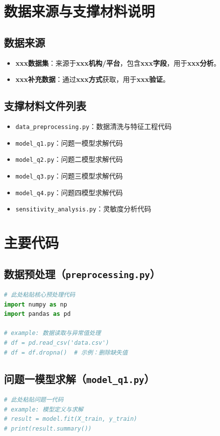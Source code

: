\documentclass[draft,12pt,a4paper]{ctexart}
\theoremstyle{definition}
\begin{document}
\section{数据来源与支撑材料说明}\label{app:data}
\subsection{数据来源}
\begin{itemize}[itemsep=1pt]
  \item \textbf{xxx数据集}：来源于\textbf{xxx机构/平台}，包含\textbf{xxx字段}，用于\textbf{xxx分析}。
  \item \textbf{xxx补充数据}：通过\textbf{xxx方式}获取，用于\textbf{xxx验证}。
\end{itemize}
\subsection{支撑材料文件列表}
\begin{itemize}[itemsep=1pt]
  \item \texttt{data\_preprocessing.py}：数据清洗与特征工程代码
  \item \texttt{model\_q1.py}：问题一模型求解代码
  \item \texttt{model\_q2.py}：问题二模型求解代码
  \item \texttt{model\_q3.py}：问题三模型求解代码
  \item \texttt{model\_q4.py}：问题四模型求解代码
  \item \texttt{sensitivity\_analysis.py}：灵敏度分析代码
\end{itemize}

\section{主要代码}\label{app:code}

\subsection{数据预处理（\texttt{preprocessing.py}）}
\begin{lstlisting}[language=Python, caption=数据清洗与特征工程示例（节选）]
# 此处粘贴核心预处理代码
import numpy as np
import pandas as pd

# example: 数据读取与异常值处理
# df = pd.read_csv('data.csv')
# df = df.dropna()  # 示例：删除缺失值
\end{lstlisting}

\subsection{问题一模型求解（\texttt{model\_q1.py}）}
\begin{lstlisting}[language=Python, caption=问题一核心求解代码示例（节选）]
# 此处粘贴问题一代码
# example: 模型定义与求解
# result = model.fit(X_train, y_train)
# print(result.summary())
\end{lstlisting}
\end{document}
